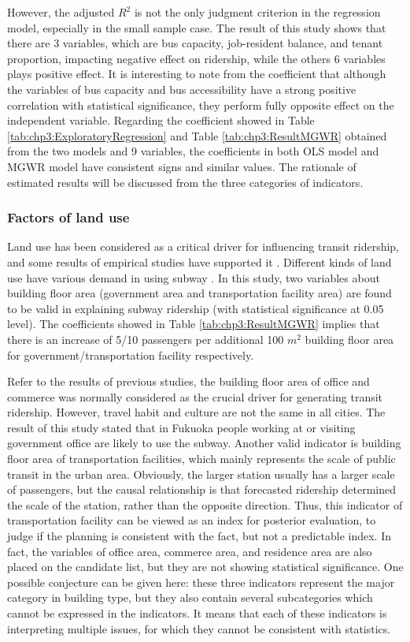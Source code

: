 %
However, the adjusted $R^2$ is not the only judgment criterion in the regression model, especially in the small sample case. The result of this study shows that there are 3 variables, which are bus capacity, job-resident balance, and tenant proportion, impacting negative effect on ridership, while the others 6 variables plays positive effect. It is interesting to note from the coefficient that although the variables of bus capacity and bus accessibility have a strong positive correlation with statistical significance, they perform fully opposite effect on the independent variable. Regarding the coefficient showed in Table \ref{tab:chp3:ExploratoryRegression} and Table \ref{tab:chp3:ResultMGWR} obtained from the two models and 9 variables, the coefficients in both OLS model and MGWR model have consistent signs and similar values. The rationale of estimated results will be discussed from the three categories of indicators.

%
\subsubsection{Factors of land use}
%
Land use has been considered as a critical driver for influencing transit ridership, and some results of empirical studies have supported it \cite{sohn2010factors,zhao2013influences,chakraborty2013land}. Different kinds of land use have various demand in using subway \cite{chakraborty2013land}. In this study, two variables about building floor area (government area and transportation facility area) are found to be valid in explaining subway ridership (with statistical significance at 0.05 level). The coefficients showed in Table \ref{tab:chp3:ResultMGWR} implies that there is an increase of 5/10 passengers per additional 100 $m^2$ building floor area for government/transportation facility respectively. 

%
Refer to the results of previous studies, the building floor area of office and commerce was normally considered as the crucial driver for generating transit ridership. However, travel habit and culture are not the same in all cities. The result of this study stated that in Fukuoka people working at or visiting government office are likely to use the subway. Another valid indicator is building floor area of transportation facilities, which mainly represents the scale of public transit in the urban area. Obviously, the larger station usually has a larger scale of passengers, but the causal relationship is that forecasted ridership determined the scale of the station, rather than the opposite direction. Thus, this indicator of transportation facility can be viewed as an index for posterior evaluation, to judge if the planning is consistent with the fact, but not a predictable index. In fact, the variables of office area, commerce area, and residence area are also placed on the candidate list, but they are not showing statistical significance. One possible conjecture can be given here: these three indicators represent the major category in building type, but they also contain several subcategories which cannot be expressed in the indicators. It means that each of these indicators is interpreting multiple issues, for which they cannot be consistent with statistics.

